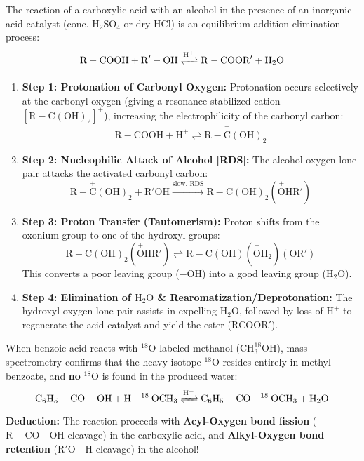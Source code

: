 \documentclass[10pt,a4paper]{article}
\begin{document}
\begin{conceptbox}
The reaction of a carboxylic acid with an alcohol in the presence of an inorganic acid catalyst (conc. $\mathrm{H_2SO_4}$ or dry $\mathrm{HCl}$) is an equilibrium addition-elimination process:
\begin{equation}
  \mathrm{R-COOH} + \mathrm{R'-OH} \xrightleftharpoons{\mathrm{H^+}} \mathrm{R-COOR'} + \mathrm{H_2O}
\end{equation}
\begin{enumerate}[leftmargin=*]
  \item \textbf{Step 1: Protonation of Carbonyl Oxygen:}
  Protonation occurs selectively at the carbonyl oxygen (giving a resonance-stabilized cation $[\mathrm{R-C(OH)_2}]^+$), increasing the electrophilicity of the carbonyl carbon:
  \begin{equation}
    \mathrm{R-COOH} + \mathrm{H^+} \rightleftharpoons \mathrm{R-\overset{+}{C}(OH)_2}
  \end{equation}
  \item \textbf{Step 2: Nucleophilic Attack of Alcohol [RDS]:}
  The alcohol oxygen lone pair attacks the activated carbonyl carbon:
  \begin{equation}
    \mathrm{R-\overset{+}{C}(OH)_2} + \mathrm{R'OH} \xrightarrow{\text{slow, RDS}} \mathrm{R-C(OH)_2(\overset{+}{O}HR')}
  \end{equation}
  \item \textbf{Step 3: Proton Transfer (Tautomerism):}
  Proton shifts from the oxonium group to one of the hydroxyl groups:
  \begin{equation}
    \mathrm{R-C(OH)_2(\overset{+}{O}HR')} \rightleftharpoons \mathrm{R-C(OH)(\overset{+}{O}H_2)(OR')}
  \end{equation}
  This converts a poor leaving group ($-\mathrm{OH}$) into a good leaving group ($\mathrm{H_2O}$).
  \item \textbf{Step 4: Elimination of $\mathrm{H_2O}$ \& Rearomatization/Deprotonation:}
  The hydroxyl oxygen lone pair assists in expelling $\mathrm{H_2O}$, followed by loss of $\mathrm{H}^+$ to regenerate the acid catalyst and yield the ester ($\mathrm{RCOOR'}$).
\end{enumerate}
\end{conceptbox}

\begin{ncertbox}
When benzoic acid reacts with $^{18}\mathrm{O}$-labeled methanol ($\mathrm{CH_3^{18}OH}$), mass spectrometry confirms that the heavy isotope $^{18}\mathrm{O}$ resides entirely in methyl benzoate, and \textbf{no} $^{18}\mathrm{O}$ is found in the produced water:
\begin{equation}
  \mathrm{C_6H_5-CO-OH} + \mathrm{H-^{18}OCH_3} \xrightleftharpoons{\mathrm{H^+}} \mathrm{C_6H_5-CO-^{18}OCH_3} + \mathrm{H_2O}
\end{equation}
\textbf{Deduction:} The reaction proceeds with \textbf{Acyl-Oxygen bond fission} ($\mathrm{R-CO\text{---}OH}$ cleavage) in the carboxylic acid, and \textbf{Alkyl-Oxygen bond retention} ($\mathrm{R'O\text{---}H}$ cleavage) in the alcohol!
\end{ncertbox}
\end{document}
